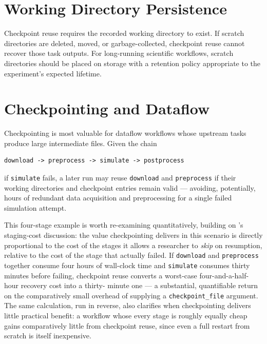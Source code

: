 \section{Working Directory Persistence}

Checkpoint reuse requires the recorded working directory to exist. If
scratch directories are deleted, moved, or garbage-collected, checkpoint
reuse cannot recover those task outputs. For long-running scientific
workflows, scratch directories should be placed on storage with a retention
policy appropriate to the experiment's expected lifetime.

\section{Checkpointing and Dataflow}

Checkpointing is most valuable for dataflow workflows whose upstream tasks
produce large intermediate files. Given the chain

\begin{lstlisting}[basicstyle=\ttfamily\small, frame=none]
download -> preprocess -> simulate -> postprocess
\end{lstlisting}

if \texttt{simulate} fails, a later run may reuse \texttt{download} and
\texttt{preprocess} if their working directories and checkpoint entries
remain valid --- avoiding, potentially, hours of redundant data acquisition
and preprocessing for a single failed simulation attempt.

This four-stage example is worth re-examining quantitatively, building on
's staging-cost discussion: the value checkpointing
delivers in this scenario is directly proportional to the cost of the
stages it allows a researcher to \emph{skip} on resumption, relative to the
cost of the stage that actually failed. If \texttt{download} and
\texttt{preprocess} together consume four hours of wall-clock time and
\texttt{simulate} consumes thirty minutes before failing, checkpoint reuse
converts a worst-case four-and-a-half-hour recovery cost into a thirty-
minute one --- a substantial, quantifiable return on the comparatively
small overhead of supplying a \texttt{checkpoint\_file} argument. The same
calculation, run in reverse, also clarifies when checkpointing delivers
little practical benefit: a workflow whose every stage is roughly equally
cheap gains comparatively little from checkpoint reuse, since even a full
restart from scratch is itself inexpensive.

